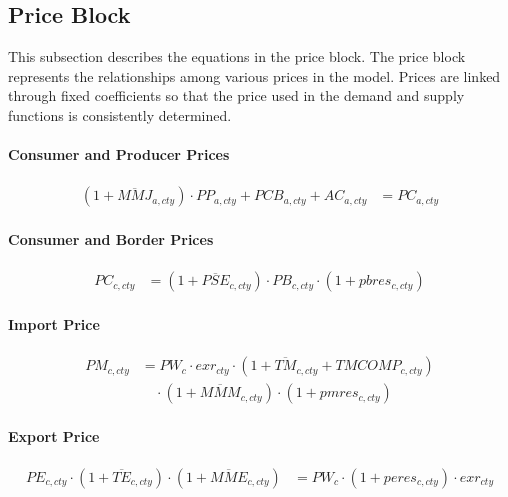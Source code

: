 \subsection{Price Block}

This subsection describes the equations in the price block.  
The price block represents the relationships among various prices in the model.  
Prices are linked through fixed coefficients so that the price used in the demand and supply functions is consistently determined.

\paragraph{Consumer and Producer Prices}
\begin{align}
  (1 + \overline{MMJ}_{a,cty})
  \cdot PP_{a,cty}
  + PCB_{a,cty}
  + AC_{a,cty}
  &= PC_{a,cty}
  \tag{PCEQ}\label{eq:PCEQ}
\end{align}

\paragraph{Consumer and Border Prices}
\begin{align}
  PC_{c,cty}
  &= (1 + \overline{PSE}_{c,cty})
     \cdot PB_{c,cty}
     \cdot (1 + pbres_{c,cty})
  \tag{PBEQ}\label{eq:PBEQ}
\end{align}

\paragraph{Import Price}
\begin{align}
  PM_{c,cty}
  &= PW_{c}
     \cdot exr_{cty}
     \cdot
     (1 + \overline{TM}_{c,cty} + TMCOMP_{c,cty})
     \nonumber\\[-0.3em]
  &\quad
     \cdot (1 + \overline{MMM}_{c,cty})
     \cdot (1 + pmres_{c,cty})
  \tag{PMEQ}\label{eq:PMEQ}
\end{align}

\paragraph{Export Price}
\begin{align}
  PE_{c,cty}
  \cdot (1 + \overline{TE}_{c,cty})
  \cdot (1 + \overline{MME}_{c,cty})
  &= PW_{c}
     \cdot (1 + peres_{c,cty})
     \cdot exr_{cty}
  \tag{PEEQ}\label{eq:PEEQ}
\end{align}


